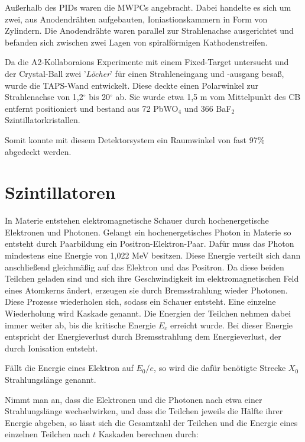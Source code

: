 \documentclass[a4paper,11pt,oneside,final,german,openbib,pdftex]{scrbook}
\begin{document}
{Au{\ss}erhalb des PIDs waren die MWPCs angebracht. Dabei handelte es sich um zwei, aus Anodendr\"ahten aufgebauten, Ioniastionskammern in Form von Zylindern. Die Anodendr\"ahte waren parallel zur Strahlenachse ausgerichtet und befanden sich zwischen zwei Lagen von spiralf\"ormigen Kathodenstreifen. 

Da die A2-Kollaboraions Experimente mit einem Fixed-Target untersucht und der Crystal-Ball zwei '\textit{L\"ocher}' f\"ur einen Strahleneingang und -ausgang besa{\ss}, wurde die TAPS-Wand entwickelt. Diese deckte einen Polarwinkel zur Strahlenachse von 1,2$^{\circ}$ bis 20$^{\circ}$ ab. Sie wurde etwa 1,5 m vom Mittelpunkt des CB entfernt positioniert und bestand aus 72 PbWO$_4$ und 366 BaF$_2$ Szintillatorkristallen. 

Somit konnte mit diesem Detektorsystem ein Raumwinkel von fast 97\% abgedeckt werden.

\section{Szintillatoren}
\label{fig:Szintillatoren}

In Materie entstehen elektromagnetische Schauer durch hochenergetische Elektronen und Photonen. \cite{Leo87}
Gelangt ein hochenergetisches Photon in Materie so entsteht durch Paarbildung ein Positron-Elektron-Paar. Dafür muss das Photon mindestens eine Energie von 1,022 MeV besitzen. Diese Energie verteilt sich dann anschließend gleichmäßig auf das Elektron und das Positron. Da diese beiden Teilchen geladen sind und sich ihre Geschwindigkeit im elektromagnetischen Feld eines Atomkerns ändert, erzeugen sie durch Bremsstrahlung wieder Photonen. Diese Prozesse wiederholen sich, sodass ein Schauer entsteht. Eine einzelne Wiederholung wird Kaskade genannt. Die Energien der Teilchen nehmen dabei immer weiter ab, bis die kritische Energie $E_c$ erreicht wurde. Bei dieser Energie entspricht der Energieverlust durch Bremsstrahlung dem Energieverlust, der durch Ionisation entsteht.

Fällt die Energie eines Elektron auf $E_0/e$, so wird die dafür benötigte Strecke $X_0$ Strahlungslänge genannt.
\newline

Nimmt man an, dass die Elektronen und die Photonen nach etwa einer Strahlungslänge wechselwirken, und dass die Teilchen jeweils die Hälfte ihrer Energie abgeben, so lässt sich die Gesamtzahl der Teilchen und die Energie eines einzelnen Teilchen nach $t$ Kaskaden berechnen durch\cite{Leo87}:

}
\end{document}
